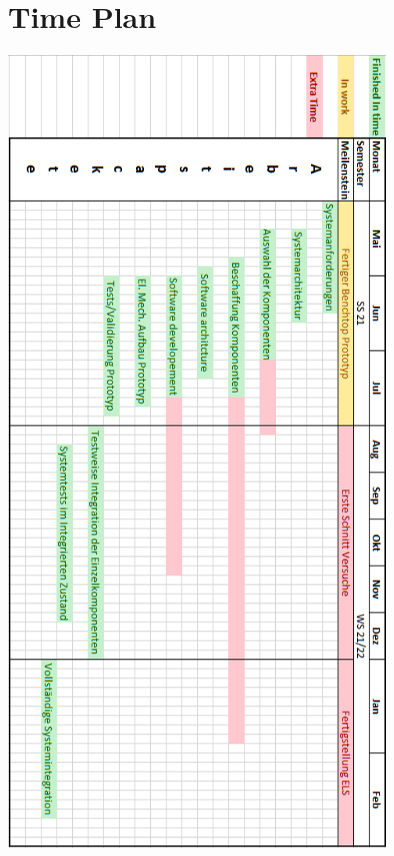 \chapter{Time Plan}
\label{AppTime}
\begin{center}
\includegraphics[width=10cm]{Pictures/AppTimePlan.png}
\end{center}